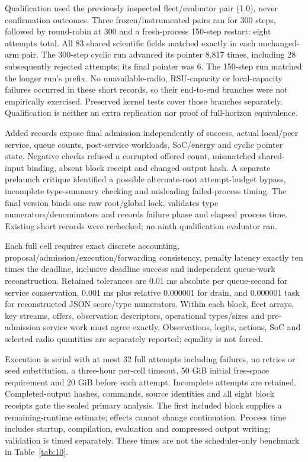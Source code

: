 \documentclass[11pt,a4paper]{article}
\begin{document}
Qualification used the previously inspected fleet/evaluator pair (1,0), never confirmation outcomes. Three frozen/instrumented pairs ran for 300 steps, followed by round-robin at 300 and a fresh-process 150-step restart: eight attempts total. All 83 shared scientific fields matched exactly in each unchanged-arm pair. The 300-step cyclic run advanced its pointer 8,817 times, including 28 subsequently rejected attempts; its final pointer was 6. The 150-step run matched the longer run's prefix. No unavailable-radio, RSU-capacity or local-capacity failures occurred in these short records, so their end-to-end branches were not empirically exercised. Preserved kernel tests cover those branches separately. Qualification is neither an extra replication nor proof of full-horizon equivalence.

Added records expose final admission independently of success, actual local/peer service, queue counts, post-service workloads, SoC/energy and cyclic pointer state. Negative checks refused a corrupted offered count, mismatched shared-input binding, absent block receipt and changed output hash. A separate prelaunch critique identified a possible alternate-root attempt-budget bypass, incomplete type-summary checking and misleading failed-process timing. The final version binds one raw root/global lock, validates type numerators/denominators and records failure phase and elapsed process time. Existing short records were rechecked; no ninth qualification evaluator ran.

Each full cell requires exact discrete accounting, proposal/admission/execution/forwarding consistency, penalty latency exactly ten times the deadline, inclusive deadline success and independent queue-work reconstruction. Retained tolerances are 0.01 ms absolute per queue-second for service conservation, 0.001 ms plus relative 0.000001 for drain, and 0.000001 task for reconstructed JSON score/type numerators. Within each block, fleet arrays, key streams, offers, observation descriptors, operational types/sizes and pre-admission service work must agree exactly. Observations, logits, actions, SoC and selected radio quantities are separately reported; equality is not forced.

Execution is serial with at most 32 full attempts including failures, no retries or seed substitution, a three-hour per-cell timeout, 50 GiB initial free-space requirement and 20 GiB before each attempt. Incomplete attempts are retained. Completed-output hashes, commands, source identities and all eight block receipts gate the sealed primary analysis. The first included block supplies a remaining-runtime estimate; effects cannot change continuation. Process time includes startup, compilation, evaluation and compressed output writing; validation is timed separately. These times are not the scheduler-only benchmark in Table~\ref{tab:10}.
\end{document}
